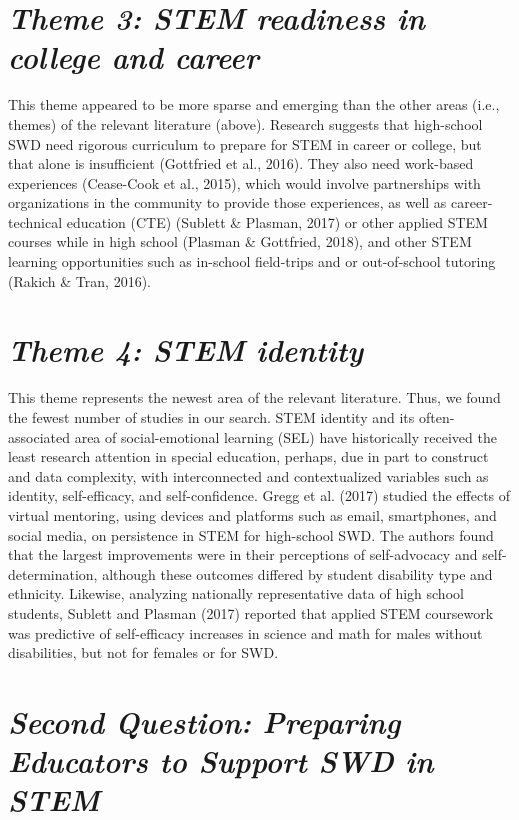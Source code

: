 \documentclass[11pt]{sig-alternate}
\begin{document}
\begin{large}
\section*{\textit{Theme 3: STEM readiness in college and career }}

This theme appeared to be more sparse and emerging than the other areas (i.e., themes) of the relevant literature (above). Research suggests that high-school SWD need rigorous curriculum to prepare for STEM in career or college, but that alone is insufficient (Gottfried et al., 2016). They also need work-based experiences (Cease-Cook et al., 2015), which would involve partnerships with organizations in the community to provide those experiences, as well as career-technical education (CTE) (Sublett \& Plasman, 2017) or other applied STEM courses while in high school (Plasman \& Gottfried, 2018), and other STEM learning opportunities such as in-school field-trips and or out-of-school tutoring (Rakich \& Tran, 2016).  


\section*{\textit{Theme 4: STEM identity }}
  
This theme represents the newest area of the relevant literature. Thus, we found the fewest number of studies in our search. STEM identity and its often-associated area of social-emotional learning (SEL) have historically received the least research attention in special education, perhaps, due in part to construct and data complexity, with interconnected and contextualized variables such as identity, self-efficacy, and self-confidence. Gregg et al. (2017) studied the effects of virtual mentoring, using devices and platforms such as email, smartphones, and social media, on persistence in STEM for high-school SWD. The authors found that the largest improvements were in their perceptions of self-advocacy and self-determination, although these outcomes differed by student disability type and ethnicity. Likewise, analyzing nationally representative data of high school students, Sublett and Plasman (2017) reported that applied STEM coursework was predictive of self-efficacy increases in science and math for males without disabilities, but not for females or for SWD.    

\section*{\textit{Second Question: Preparing Educators to Support SWD in STEM}}


\end{large}
\end{document}

